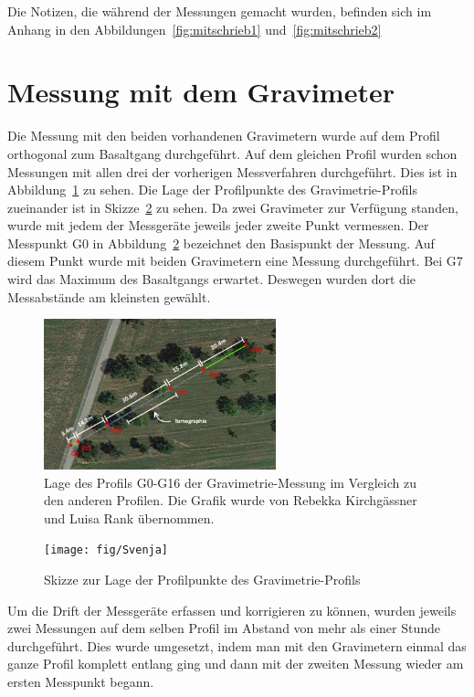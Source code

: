 Die Notizen, die während der Messungen gemacht wurden, befinden sich im Anhang in den Abbildungen~\ref{fig:mitschrieb1} und~\ref{fig:mitschrieb2}

\section{Messung mit dem Gravimeter}

Die Messung mit den beiden vorhandenen Gravimetern wurde auf dem Profil orthogonal zum Basaltgang durchgeführt. Auf dem gleichen Profil wurden schon Messungen mit allen drei der vorherigen Messverfahren durchgeführt. Dies ist in Abbildung~\ref{fig:Luisa} zu sehen. Die Lage der Profilpunkte des Gravimetrie-Profils zueinander ist in Skizze~\ref{fig:Svenja} zu sehen. Da zwei Gravimeter zur Verfügung standen, wurde mit jedem der Messgeräte jeweils jeder zweite Punkt vermessen. Der Messpunkt G0 in Abbildung~\ref{fig:Svenja} bezeichnet den Basispunkt der Messung. Auf
diesem Punkt wurde mit beiden Gravimetern eine Messung durchgeführt. Bei G7 wird das Maximum des Basaltgangs erwartet. Deswegen wurden dort die Messabstände am kleinsten gewählt.

\begin{figure}[!ht]
 \centering
 \includegraphics[width=0.6\textwidth]{fig/Luisa}
 \caption[Lage des Profils G0-G16 der Gravimetrie-Messung im Vergleich zu den anderen Profilen]{Lage des Profils G0-G16 der Gravimetrie-Messung im Vergleich zu den anderen Profilen. Die Grafik wurde von Rebekka Kirchgässner und Luisa Rank übernommen.}
 \label{fig:Luisa}
\end{figure}

\begin{figure}[!ht]
 \centering
 \texttt{[image: fig/Svenja]}
 \caption{ Skizze zur Lage der Profilpunkte des Gravimetrie-Profils}
 \label{fig:Svenja}
\end{figure}

Um die Drift der Messgeräte erfassen und korrigieren zu können, wurden jeweils zwei Messungen auf dem selben Profil im Abstand von mehr als einer Stunde durchgeführt. Dies wurde umgesetzt, indem man mit den Gravimetern einmal das ganze Profil komplett entlang ging und dann mit der zweiten Messung wieder am ersten Messpunkt begann.

